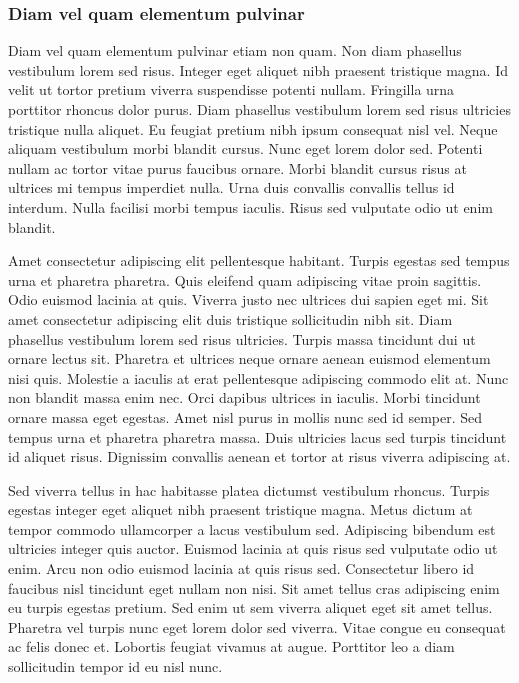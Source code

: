 \subsubsection{Diam vel quam elementum pulvinar}
Diam vel quam elementum pulvinar etiam non quam. Non diam phasellus vestibulum lorem sed risus. Integer eget aliquet nibh praesent tristique magna. Id velit ut tortor pretium viverra suspendisse potenti nullam. Fringilla urna porttitor rhoncus dolor purus. Diam phasellus vestibulum lorem sed risus ultricies tristique nulla aliquet. Eu feugiat pretium nibh ipsum consequat nisl vel. Neque aliquam vestibulum morbi blandit cursus. Nunc eget lorem dolor sed. Potenti nullam ac tortor vitae purus faucibus ornare. Morbi blandit cursus risus at ultrices mi tempus imperdiet nulla. Urna duis convallis convallis tellus id interdum. Nulla facilisi morbi tempus iaculis. Risus sed vulputate odio ut enim blandit.

Amet consectetur adipiscing elit pellentesque habitant. Turpis egestas sed tempus urna et pharetra pharetra. Quis eleifend quam adipiscing vitae proin sagittis. Odio euismod lacinia at quis. Viverra justo nec ultrices dui sapien eget mi. Sit amet consectetur adipiscing elit duis tristique sollicitudin nibh sit. Diam phasellus vestibulum lorem sed risus ultricies. Turpis massa tincidunt dui ut ornare lectus sit. Pharetra et ultrices neque ornare aenean euismod elementum nisi quis. Molestie a iaculis at erat pellentesque adipiscing commodo elit at. Nunc non blandit massa enim nec. Orci dapibus ultrices in iaculis. Morbi tincidunt ornare massa eget egestas. Amet nisl purus in mollis nunc sed id semper. Sed tempus urna et pharetra pharetra massa. Duis ultricies lacus sed turpis tincidunt id aliquet risus. Dignissim convallis aenean et tortor at risus viverra adipiscing at.

Sed viverra tellus in hac habitasse platea dictumst vestibulum rhoncus. Turpis egestas integer eget aliquet nibh praesent tristique magna. Metus dictum at tempor commodo ullamcorper a lacus vestibulum sed. Adipiscing bibendum est ultricies integer quis auctor. Euismod lacinia at quis risus sed vulputate odio ut enim. Arcu non odio euismod lacinia at quis risus sed. Consectetur libero id faucibus nisl tincidunt eget nullam non nisi. Sit amet tellus cras adipiscing enim eu turpis egestas pretium. Sed enim ut sem viverra aliquet eget sit amet tellus. Pharetra vel turpis nunc eget lorem dolor sed viverra. Vitae congue eu consequat ac felis donec et. Lobortis feugiat vivamus at augue. Porttitor leo a diam sollicitudin tempor id eu nisl nunc.


